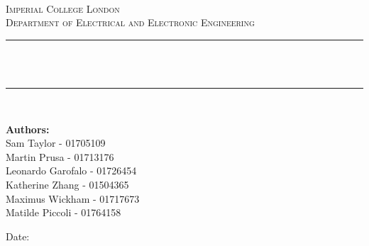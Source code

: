 \begin{titlepage}

\newcommand{\HRule}{\rule{\linewidth}{0.5mm}} %






\begin{center} %

\textsc{\LARGE \reporttype}\\[1.5cm] 
\textsc{\Large Imperial College London}\\[0.5cm] 
\textsc{\large Department of Electrical and Electronic Engineering}\\[0.5cm] 

\HRule \\[0.4cm]
{ \huge \bfseries \reporttitle}\\ %
\HRule \\[1.5cm]
\end{center}

\begin{center}
\textbf{Authors:}\\
Sam Taylor - 01705109\\
Martin Prusa - 01713176\\
Leonardo Garofalo - 01726454\\
Katherine Zhang - 01504365\\
Maximus Wickham - 01717673\\
Matilde Piccoli - 01764158 \\
\end{center}
\vspace{2cm}
\makeatletter
\centering
Date: \@date 

\vfill %



\makeatother


\end{titlepage}

